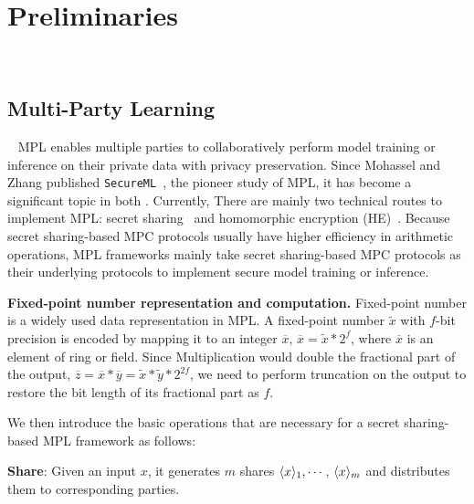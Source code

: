 \section{Preliminaries}~\label{sec:pre}
\vspace{-6mm}
\subsection{Multi-Party Learning}~\label{subsec:mpl}
MPL enables multiple parties to collaboratively perform model training or inference on their private data with privacy preservation. Since Mohassel and Zhang published \texttt{SecureML}~\cite{DBLP:conf/sp/MohasselZ17}, the pioneer study of MPL, it has become a significant topic in both . Currently, There are mainly two technical routes to implement MPL: secret sharing~\cite{ref_damgard} and homomorphic encryption (HE)~\cite{yi2014homomorphic}. Because secret sharing-based MPC protocols usually have higher efficiency in arithmetic operations, MPL frameworks mainly take secret sharing-based MPC protocols as their underlying protocols to implement secure model training or inference.  

\smallskip
\noindent\textbf{Fixed-point number representation and computation.} Fixed-point number is a widely used data representation in MPL. A fixed-point number $\widetilde{x}$ with $f$-bit precision is encoded by mapping it to an integer $\overline{x}$,  $\overline{x} = \widetilde{x} * 2^f$, where $\overline{x}$ is an element of ring or field. Since Multiplication would double the fractional part of the output,  $\overline{z} = \overline{x}*\overline{y} = \widetilde{x} * \widetilde{y} * 2^{2f}$, we need to perform truncation on the output to restore the bit length of its fractional part as $f$. 

We then introduce the basic operations that are necessary for a secret sharing-based MPL framework as follows: 


   \noindent \textbf{Share}: Given an input $x$, it generates $m$ shares $\langle {x} \rangle_1, \cdots$, $\langle {x} \rangle_m$ and distributes them to corresponding parties.
   
